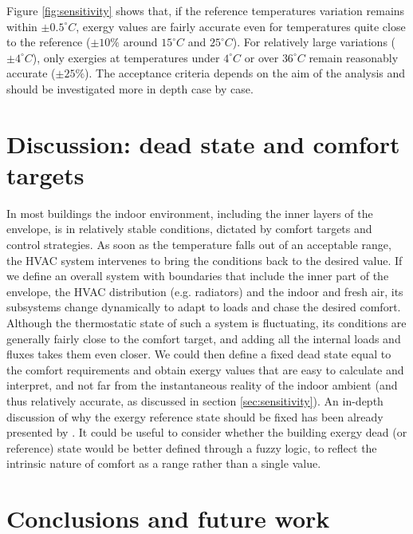 \documentclass[10pt]{extarticle} %
\begin{document}
\vfill \break


\noindent Figure \ref{fig:sensitivity} shows that, if the reference temperatures variation remains within $\pm 0.5^\circ C$, exergy values are fairly accurate even for temperatures quite close to the reference ($\pm 10 \%$ around $15^\circ C$ and $25^\circ C$). For relatively large variations ($\pm 4^\circ C$), only exergies at temperatures under $4^\circ C$ or over $36^\circ C$ remain reasonably accurate ($\pm 25 \%$). The acceptance criteria depends on the aim of the analysis and should be investigated more in depth case by case. 

\section{Discussion: dead state and comfort targets} 

In most buildings the indoor environment, including the inner layers of the envelope, is in relatively stable conditions, dictated by comfort targets and control strategies. As soon as the temperature falls out of an acceptable range, the HVAC system intervenes to bring the conditions back to the desired value. If we define an overall system with boundaries that include the inner part of the envelope, the HVAC distribution (e.g. radiators) and the indoor and fresh air, its subsystems change dynamically to adapt to loads and chase the desired comfort. Although the thermostatic state of such a system is fluctuating, its conditions are generally fairly close to the comfort target, and adding all the internal loads and fluxes takes them even closer. We could then define a fixed dead state equal to the comfort requirements and obtain exergy values that are easy to calculate and interpret, and not far from the instantaneous reality of the indoor ambient (and thus relatively accurate, as discussed in section \ref{sec:sensitivity}). An in-depth discussion of why the exergy reference state should be fixed has been already presented by \cite{Pons2019}. It could be useful to consider whether the building exergy dead (or reference) state would be better defined through a fuzzy logic, to reflect the intrinsic nature of comfort as a range rather than a single value.



\section{Conclusions and future work}
\end{document}
